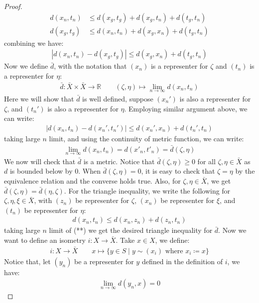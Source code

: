 \documentclass[11pt]{book}
\theoremstyle{break}
\theoremstyle{break}
\newcommand{\R}{\mathbb{R}}
\begin{document}
\begin{proof}
\begin{align*}
d(x_n,t_n) &\leq d(x_g,t_g) + d(x_g,t_n) + d(t_g,t_n)\\
d(x_g,t_g) & \leq d(x_n,t_n) + d(x_g,x_n) + d(t_g,t_n)
\end{align*}
combining we have:
\begin{align*}
|d(x_n,t_n) - d(x_g,t_g) | \leq d(x_g,x_n) + d(t_g,t_n)
\end{align*}
Now we define $\bar{d}$, with the notation that $(x_n)$ is a representer for $\zeta$ and $(t_n)$ is a representer for $\eta$:
\begin{align*}
\bar{d}: \bar{X}\times \bar{X} \to \R \qquad (\zeta,\eta) \mapsto \lim_{n\to \infty}d(x_n,t_n)
\end{align*}
Here we will show that $\bar{d}$ is well defined, suppose $(x_n')$ is also a representer for $\zeta$, and $(t_n')$ is also a representer for $\eta$. Employing similar argument above, we can write:
\begin{align*}
|d(x_n,t_n) - d(x_n',t_n')| \leq d(x_n',x_n) + d(t_n',t_n)
\end{align*}
taking large $n$ limit, and using the continuity of metric function, we can write:
\begin{align*}
\lim_{n\to \infty}d(x_n,t_n) = d(x'_n,t'_n) = \bar{d}(\zeta,\eta)
\end{align*}
We now will check that $\bar{d}$ is a metric. Notice that $\bar{d}(\zeta, \eta) \geq 0$ for all $\zeta, \eta \in \bar{X}$ as $d$ is bounded below by $0$. When $\bar{d}(\zeta, \eta) = 0$, it is easy to check that $\zeta = \eta$ by the equivalence relation and the converse holds true. Also, for $\zeta, \eta \in \bar{X}$, we get $\bar{d}(\zeta, \eta) = \bar{d}(\eta, \zeta)$. For the triangle inequality, we write the following for $\zeta,\eta, \xi \in \bar{X}$, with $(z_n)$ be representer for $\zeta$, $(x_n)$ be representer for $\xi$, and $(t_n)$ be representer for $\eta$:
\begin{align*}
d(x_n,t_n) \leq d(x_n,z_n) + d(z_n,t_n) \tag{**}
\end{align*}
taking large $n$ limit of (**) we get the desired triangle inequality for $\bar{d}$. Now we want to define an isometry $i:X \to \bar{X}$. Take $x \in X$, we define:
\begin{align*}
i:X \to \bar{X}\qquad x\mapsto \{ y \in S \mid y \sim (x_i) \text{ where }x_i \coloneqq x\}
\end{align*}
Notice that, let $(y_n)$ be a representer for $y$ defined in the definition of $i$, we have:
\begin{align*}
\lim_{n\to \infty}d(y_n,x) = 0

\end{align*}
\end{proof}
\end{document}
